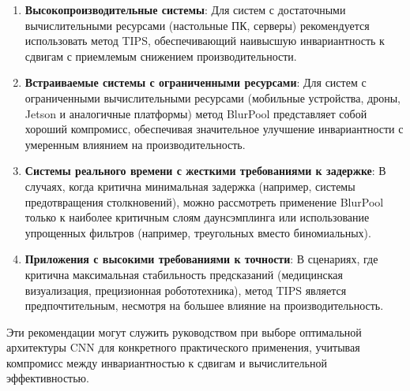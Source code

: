 \begin{enumerate}
    \item \textbf{Высокопроизводительные системы}: Для систем с достаточными вычислительными ресурсами (настольные ПК, серверы) рекомендуется использовать метод TIPS, обеспечивающий наивысшую инвариантность к сдвигам с приемлемым снижением производительности.
    
    \item \textbf{Встраиваемые системы с ограниченными ресурсами}: Для систем с ограниченными вычислительными ресурсами (мобильные устройства, дроны, Jetson и аналогичные платформы) метод BlurPool представляет собой хороший компромисс, обеспечивая значительное улучшение инвариантности с умеренным влиянием на производительность.
    
    \item \textbf{Системы реального времени с жесткими требованиями к задержке}: В случаях, когда критична минимальная задержка (например, системы предотвращения столкновений), можно рассмотреть применение BlurPool только к наиболее критичным слоям даунсэмплинга или использование упрощенных фильтров (например, треугольных вместо биномиальных).
    
    \item \textbf{Приложения с высокими требованиями к точности}: В сценариях, где критична максимальная стабильность предсказаний (медицинская визуализация, прецизионная робототехника), метод TIPS является предпочтительным, несмотря на большее влияние на производительность.
\end{enumerate}

Эти рекомендации могут служить руководством при выборе оптимальной архитектуры CNN для конкретного практического применения, учитывая компромисс между инвариантностью к сдвигам и вычислительной эффективностью. 